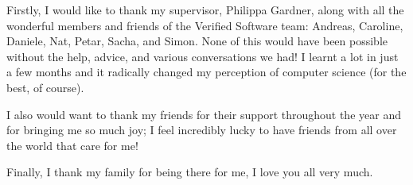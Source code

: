 Firstly, I would like to thank my supervisor, Philippa Gardner, along with all the wonderful members and friends of the Verified Software team: Andreas, Caroline, Daniele, Nat, Petar, Sacha, and Simon. None of this would have been possible without the help, advice, and various conversations we had! I learnt a lot in just a few months and it radically changed my perception of computer science (for the best, of course).

I also would want to thank my friends for their support throughout the year and for bringing me so much joy; I feel incredibly lucky to have friends from all over the world that care for me!

Finally, I thank my family for being there for me, I love you all very much.
